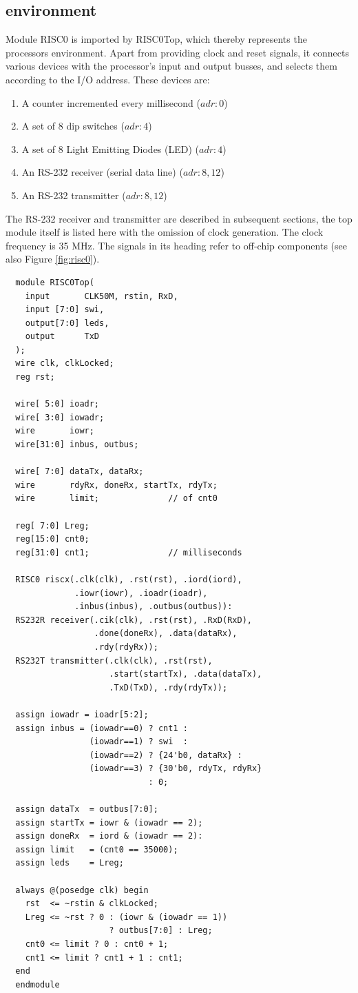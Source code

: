 \subsection{environment}
Module RISC0 is imported by RISC0Top, which thereby represents the processors environment. Apart
from providing clock and reset signals, it connects various devices with the processor’s input and
output busses, and selects them according to the I/O address. These devices are:
\begin{enumerate}
  \item A counter incremented every millisecond ($adr: 0$)
  \item A set of 8 dip switches ($adr: 4$)
  \item A set of 8 Light Emitting Diodes (LED) ($adr: 4$)
  \item An RS-232 receiver (serial data line) ($adr: 8, 12$)
  \item An RS-232 transmitter ($adr: 8, 12$)
\end{enumerate}

The RS-232 receiver and transmitter are described in subsequent sections, the top module itself is
listed here with the omission of clock generation. The clock frequency is 35 MHz. The signals in its
heading refer to off-chip components (see also Figure \ref{fig:risc0}).
\begin{verbatim}
  module RISC0Top(
    input       CLK50M, rstin, RxD,
    input [7:0] swi,
    output[7:0] leds,
    output      TxD
  );
  wire clk, clkLocked;
  reg rst;
 
  wire[ 5:0] ioadr;
  wire[ 3:0] iowadr;
  wire       iowr;
  wire[31:0] inbus, outbus;
 
  wire[ 7:0] dataTx, dataRx;
  wire       rdyRx, doneRx, startTx, rdyTx;
  wire       limit;              // of cnt0
 
  reg[ 7:0] Lreg;
  reg[15:0] cnt0;
  reg[31:0] cnt1;                // milliseconds
 
  RISC0 riscx(.clk(clk), .rst(rst), .iord(iord),
              .iowr(iowr), .ioadr(ioadr),
              .inbus(inbus), .outbus(outbus)):
  RS232R receiver(.cik(clk), .rst(rst), .RxD(RxD),
                  .done(doneRx), .data(dataRx),
                  .rdy(rdyRx));
  RS232T transmitter(.clk(clk), .rst(rst),
                     .start(startTx), .data(dataTx),
                     .TxD(TxD), .rdy(rdyTx));

  assign iowadr = ioadr[5:2];
  assign inbus = (iowadr==0) ? cnt1 :
                 (iowadr==1) ? swi  :
                 (iowadr==2) ? {24'b0, dataRx} :
                 (iowadr==3) ? {30'b0, rdyTx, rdyRx}
                             : 0;

  assign dataTx  = outbus[7:0];
  assign startTx = iowr & (iowadr == 2);
  assign doneRx  = iord & (iowadr == 2):
  assign limit   = (cnt0 == 35000);
  assign leds    = Lreg;
 
  always @(posedge clk) begin
    rst  <= ~rstin & clkLocked;
    Lreg <= ~rst ? 0 : (iowr & (iowadr == 1))
                     ? outbus[7:0] : Lreg;
    cnt0 <= limit ? 0 : cnt0 + 1;
    cnt1 <= limit ? cnt1 + 1 : cnt1;
  end
  endmodule
\end{verbatim}

